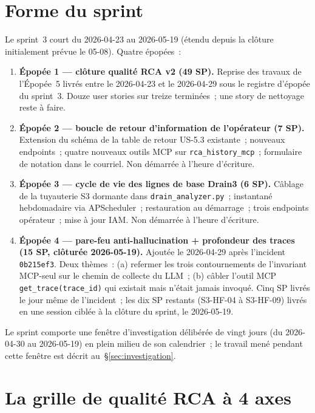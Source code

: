 \documentclass[11pt,a4paper,oneside]{report}
\begin{document}
\section{Forme du sprint}

Le sprint~3 court du 2026-04-23 au 2026-05-19 (étendu depuis la
clôture initialement prévue le 05-08). Quatre épopées~:

\begin{enumerate}
  \item \textbf{Épopée 1 --- clôture qualité RCA v2 (49 SP).}
        Reprise des travaux de l'Épopée~5 livrés entre le
        2026-04-23 et le 2026-04-29 sous le registre d'épopée du
        sprint~3. Douze user stories sur treize terminées~; une
        story de nettoyage reste à faire.
  \item \textbf{Épopée 2 --- boucle de retour d'information de
        l'opérateur (7 SP).} Extension du schéma de la table de
        retour US-5.3 existante~; nouveaux endpoints~; quatre
        nouveaux outils MCP sur \texttt{rca\_history\_mcp}~;
        formulaire de notation dans le courriel. Non démarrée à
        l'heure d'écriture.
  \item \textbf{Épopée 3 --- cycle de vie des lignes de base
        Drain3 (6 SP).} Câblage de la tuyauterie S3 dormante dans
        \texttt{drain\_analyzer.py}~; instantané hebdomadaire via
        APScheduler~; restauration au démarrage~; trois endpoints
        opérateur~; mise à jour IAM. Non démarrée à l'heure
        d'écriture.
  \item \textbf{Épopée 4 --- pare-feu anti-hallucination +
        profondeur des traces (15 SP, clôturée 2026-05-19).}
        Ajoutée le 2026-04-29 après l'incident
        \texttt{0b215ef3}. Deux thèmes~: (a) refermer les trois
        contournements de l'invariant MCP-seul sur le chemin de
        collecte du LLM~; (b) câbler l'outil MCP
        \texttt{get\_trace(trace\_id)} qui existait mais n'était
        jamais invoqué. Cinq SP livrés le jour même de
        l'incident~; les dix SP restants (S3-HF-04 à S3-HF-09)
        livrés en une session ciblée à la clôture du sprint, le
        2026-05-19.
\end{enumerate}

Le sprint comporte une fenêtre d'investigation délibérée de vingt
jours (du 2026-04-30 au 2026-05-19) en plein milieu de son
calendrier~; le travail mené pendant cette fenêtre est décrit
au~\S\ref{sec:investigation}.

\section{La grille de qualité RCA à 4 axes}
\end{document}
